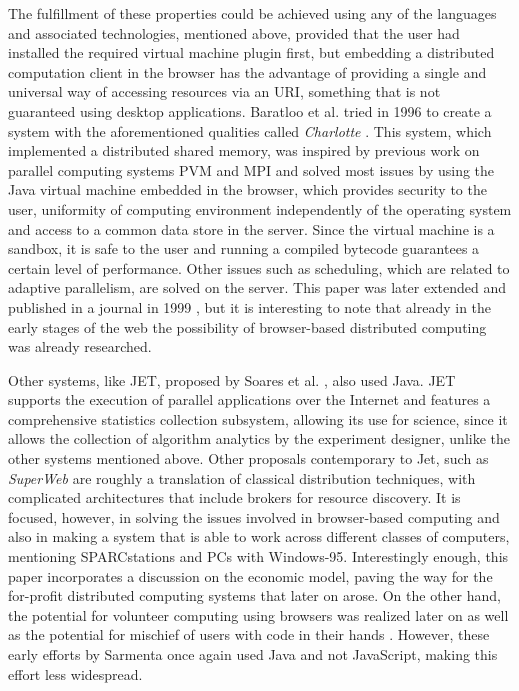 \documentclass[journal,onecolumn]{IEEEtran}
\begin{document}
The fulfillment of these properties could be achieved using any of the
languages and associated technologies, mentioned above, provided that the user had
installed the required virtual machine plugin first, but embedding a
distributed computation client in the browser has the advantage of
providing a single and universal way of accessing resources via an
URI, something that is not guaranteed using desktop
applications. Baratloo et al. tried in 1996 to create a system with
the aforementioned qualities called {\em Charlotte}
\cite{baratloo1996charlotte}. This system, which implemented a
distributed shared memory, was inspired by previous work
on parallel computing systems PVM and MPI and solved most issues by
using the Java virtual machine embedded in the browser,
which provides
security to the user, uniformity of computing environment
independently of the operating system and access to a common data store in the
server. Since the virtual machine is a sandbox, it is safe to the user
and running a compiled bytecode guarantees a certain level of
performance.
 Other issues such as scheduling, which are related to adaptive
 parallelism, are solved on the server. This
paper was later extended and published in a journal in 1999
\cite{baratloo1999charlotte}, but it is interesting to note that
already in the early stages of the web the possibility of
browser-based distributed computing was already researched.

Other systems, like JET, proposed by Soares et
al. \cite{soares1998get}, also used Java. JET supports
the execution of parallel applications over the Internet and features
a comprehensive statistics collection subsystem, allowing its use for science,
since it allows the collection of algorithm analytics by the
experiment designer, unlike the other systems mentioned
above. Other proposals contemporary to Jet, such as {\em SuperWeb}
\cite{alexandrov1997superweb} are roughly a translation of classical
distribution techniques, with complicated architectures that include
brokers for resource discovery. It is focused, however, in solving the
issues involved in browser-based computing and also in making a system
that is able to work across different classes of computers, mentioning
SPARCstations and PCs with Windows-95. Interestingly enough, this
paper incorporates a discussion on the economic model, paving the way
for the for-profit distributed computing systems that later on
arose. On the other hand, the potential for volunteer computing using
browsers was realized
later on \cite{sarmenta-bayanihan} as well as the potential for
mischief of users with code in their hands
\cite{sarmenta-sabotagetolerance}. However, these early efforts by
Sarmenta once again used Java and not JavaScript, making this effort
less widespread.
\end{document}
